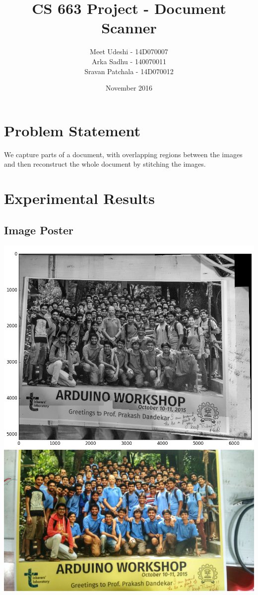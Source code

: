 \documentclass{article}
\title{CS 663 Project - Document Scanner}
\author{Meet Udeshi - 14D070007\\
Arka Sadhu - 140070011\\
Sravan Patchala - 14D070012\\
}
\date{November 2016}
\begin{document}
\maketitle
 
\section*{Problem Statement}

We capture parts of a document, with overlapping regions between the images and then reconstruct the  whole document by stitching the images.

\section*{Experimental Results}
\subsection*{Image Poster}

\includegraphics[scale=0.25]{tl_poster/figure_1}
\includegraphics[scale=0.075]{tl_poster/original_tl_poster}
\end{document}
